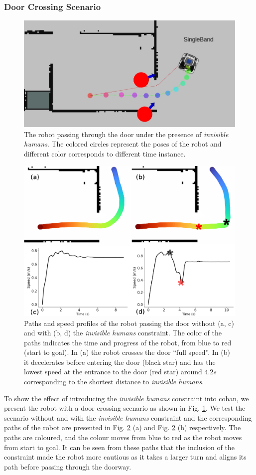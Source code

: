 \subsubsection{Door Crossing Scenario}
\begin{figure}[!h]
    \centering
    \includegraphics[width=0.8\columnwidth]{images/chapter5/door_secne.png}
    \caption{The robot passing through the door under the presence of \textit{invisible humans}. The colored circles represent the poses of the robot and different color corresponds to different time instance.}
    \label{fig:door_scene}
\end{figure}
\begin{figure}[!h]
\centering
\includegraphics[width=0.85\columnwidth]{images/chapter5/door_new.png}
\caption{Paths and speed profiles of the robot passing the door without (a, c) and with (b, d) the \textit{invisible humans} constraint. The color of the paths indicates the time and progress of the robot, from blue to red (start to goal). In (a) the robot crosses the door “full speed”. In (b) it decelerates before entering the door (black star) and has the lowest speed at the entrance to the door (red star) around $4.2s$ corresponding to the shortest distance to \textit{invisible humans}.}
\label{fig:door_constraint}
\end{figure}
To show the effect of introducing the \textit{invisible humans} constraint into \acrshort{cohan}, we present the robot with a door crossing scenario as shown in Fig. \ref{fig:door_scene}. We test the scenario without and with the \textit{invisible humans} constraint and the corresponding paths of the robot are presented in Fig. \ref{fig:door_constraint} (a)  and Fig. \ref{fig:door_constraint} (b) respectively. The paths are coloured, and the colour moves from blue to red as the robot moves from start to goal. It can be seen from these paths that the inclusion of the constraint made the robot more cautious as it takes a larger turn and aligns its path before passing through the doorway. 

